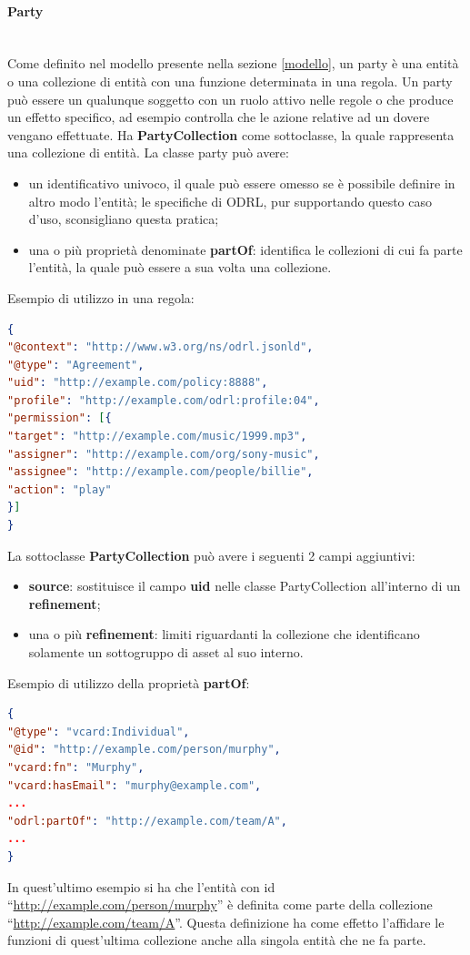 \documentclass[12pt,a4paper,twoside]{book}
\begin{document}
\paragraph{Party}\mbox{}\\
Come definito nel modello presente nella sezione \ref{modello}, un party è una entità o una collezione di entità con una funzione determinata in una regola. Un party può essere un qualunque soggetto con un ruolo attivo nelle regole o che produce un effetto specifico, ad esempio controlla che le azione relative ad un dovere vengano effettuate. Ha \textbf{PartyCollection} come sottoclasse, la quale rappresenta una collezione di entità. La classe party può avere:
\begin{itemize}
	\item un identificativo univoco, il quale può essere omesso se è possibile definire in altro modo l'entità; le specifiche di ODRL, pur supportando questo caso d'uso, sconsigliano questa pratica;
	\item una o più proprietà denominate \textbf{partOf}: identifica le collezioni di cui fa parte l'entità, la quale può essere a sua volta una collezione.
\end{itemize}
Esempio di utilizzo in una regola:
\begin{lstlisting}[language=json,firstnumber=1,caption={Utilizzo di party nelle proprietà \textbf{assigner} ed \textbf{assignee} di una regola},captionpos=b,label=esempioParty]
{
"@context": "http://www.w3.org/ns/odrl.jsonld",
"@type": "Agreement",
"uid": "http://example.com/policy:8888",
"profile": "http://example.com/odrl:profile:04",
"permission": [{
"target": "http://example.com/music/1999.mp3",
"assigner": "http://example.com/org/sony-music",
"assignee": "http://example.com/people/billie",
"action": "play"
}]
}  
\end{lstlisting}
La sottoclasse \textbf{PartyCollection} può avere i seguenti 2 campi aggiuntivi:
\begin{itemize}
	\item \textbf{source}: sostituisce il campo \textbf{uid} nelle classe PartyCollection all'interno di un \textbf{refinement};
	\item una o più \textbf{refinement}: limiti riguardanti la collezione che identificano solamente un sottogruppo di asset al suo interno.
\end{itemize}
Esempio di utilizzo della proprietà \textbf{partOf}:
\begin{lstlisting}[language=json,firstnumber=1,caption={L'entità definita è parte di una PartyCollection},captionpos=b,label=esempioPartyColl]
{
"@type": "vcard:Individual",
"@id": "http://example.com/person/murphy",
"vcard:fn": "Murphy",
"vcard:hasEmail": "murphy@example.com",
...
"odrl:partOf": "http://example.com/team/A",
...
}
\end{lstlisting}
In quest'ultimo esempio si ha che l'entità con id ``\url{http://example.com/person/murphy}'' è definita come parte della collezione ``\url{http://example.com/team/A}''. Questa definizione ha come effetto l'affidare le funzioni di quest'ultima collezione anche alla singola entità che ne fa parte.
\end{document}
